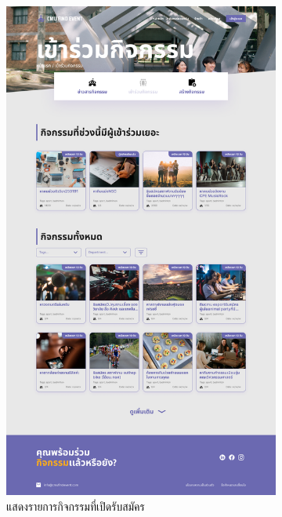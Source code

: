 \begin{figure}[h]
  \centering
  \begin{subfigure}[b]{0.3\linewidth}
    \includegraphics[width=\linewidth]{image/Figma-design/Event-join.png}
    \caption{แสดงรายการกิจกรรมที่เปิดรับสมัคร}
  \end{subfigure}
  \hfill
  \begin{subfigure}[b]{0.3\linewidth}

\end{subfigure}
\end{figure}
